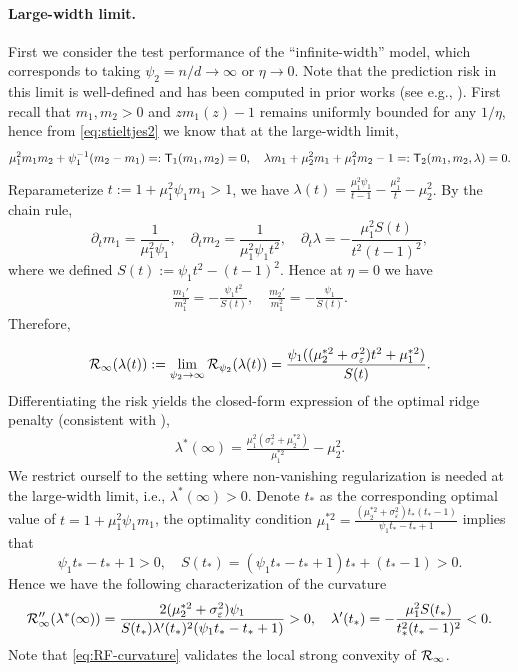 \paragraph{Large-width limit.} First we consider the test performance of the ``infinite-width'' model, which corresponds to taking $\psi_2=n/d\to\infty$ or $\eta\to 0$. Note that the prediction risk in this limit is well-defined and has been computed in prior works (see e.g., \cite{bartlett2021deep}). First recall that $m_1,m_2>0$ and $z m_1(z)-1$ remains uniformly bounded for any $1/\eta$, hence from \eqref{eq:stieltjes2} we know that at the large-width limit, 
\begin{align*}
    \mu_1^2 m_1m_2 + \psi_1^{-1} (m_2-m_1) =:{\mathsf T}_1(m_1,m_2) = 0, \quad \lambda m_1 + \mu_2^2 m_1 + \mu_1^2 m_2 - 1 =: {\mathsf T}_2(m_1,m_2,\lambda) = 0. 
\end{align*}
Reparameterize $t:= 1+\mu_1^2\psi_1 m_1>1$, we have $\lambda(t) = \frac{\mu_1^2\psi_1}{t-1} - \frac{\mu_1^2}{t} - \mu_2^2$. 
By the chain rule, 
\[
\partial_t m_1 = \frac{1}{\mu_1^2\psi_1}, \quad
\partial_t m_2 = \frac{1}{\mu_1^2\psi_1t^2}, \quad
\partial_t \lambda = -\frac{\mu_1^2S(t)}{t^2(t-1)^2}, 
\]
where we defined $S(t) := \psi_1t^2 - (t-1)^2$. Hence at $\eta=0$ we have
\begin{align*}
    \frac{m_1'}{m_1^2} = -\frac{\psi_1 t^2}{S(t)},\quad
    \frac{m_2'}{m_1^2} = -\frac{\psi_1}{S(t)}.
\end{align*}
Therefore, 

\[
{\mathcal R}_\infty(\lambda(t)):=\lim_{\psi_2\to\infty}{\mathcal R}_{\psi_2}(\lambda(t)) = \frac{\psi_1 ((\mu_2^{*2} + \sigma_\varepsilon^2) t^2 + \mu_1^{*2})}{S(t)}. 
\]
Differentiating the risk yields the closed-form expression of the optimal ridge penalty (consistent with \cite{dobriban2018high,wu2020optimal}), 
\begin{align}
\lambda^*(\infty) =  \frac{\mu_1^2(\sigma_{\varepsilon}^2+\mu_2^{*2})}{\mu_1^{*2}} - \mu_2^2. \label{eq:optimal-lambda}
\end{align}
We restrict ourself to the setting where non-vanishing regularization is needed at the large-width limit, i.e., $\lambda^*(\infty)>0$. 
Denote $t_*$ as the corresponding optimal value of $t=1+\mu_1^2\psi_1m_1$, the optimality condition $\mu_1^{*2} = \frac{(\mu_2^{*2} + \sigma_\varepsilon^2) t_*(t_*-1)}{\psi_1t_*-t_*+1}$ implies that
\[
\psi_1t_*-t_*+1>0, \quad S(t_*) = (\psi_1t_*-t_*+1) t_* + (t_*-1) > 0.
\]
Hence we have the following characterization of the curvature
\begin{align}
{\mathcal R}_\infty''(\lambda^*(\infty)) = \frac{2(\mu_2^{*2} + \sigma_\varepsilon^2)\psi_1}{S(t_*) \lambda'(t_*)^2 (\psi_1 t_*-t_*+1)} > 0, 
\quad
\lambda'(t_*) = -\frac{\mu_1^2S(t_*)}{t_*^2(t_*-1)^2} < 0. 
\label{eq:RF-curvature}
\end{align}
Note that \eqref{eq:RF-curvature} validates the local strong convexity of ${\mathcal R}_\infty$. 

